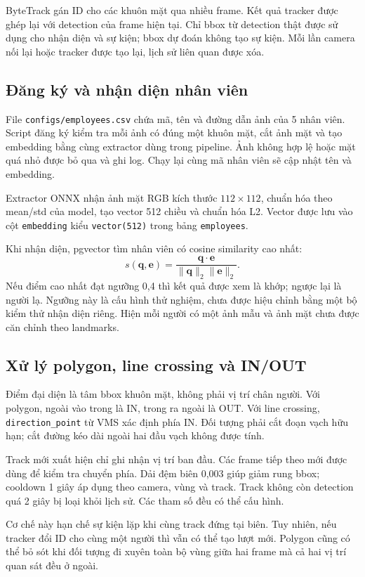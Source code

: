 \documentclass[11pt,a4paper]{article}
\begin{document}
ByteTrack gán ID cho các khuôn mặt qua nhiều frame. Kết quả tracker được ghép lại với detection của frame hiện tại. Chỉ bbox từ detection thật được sử dụng cho nhận diện và sự kiện; bbox dự đoán không tạo sự kiện. Mỗi lần camera nối lại hoặc tracker được tạo lại, lịch sử liên quan được xóa.

\subsection{Đăng ký và nhận diện nhân viên}
File \texttt{configs/employees.csv} chứa mã, tên và đường dẫn ảnh của 5 nhân viên. Script đăng ký kiểm tra mỗi ảnh có đúng một khuôn mặt, cắt ảnh mặt và tạo embedding bằng cùng extractor dùng trong pipeline. Ảnh không hợp lệ hoặc mặt quá nhỏ được bỏ qua và ghi log. Chạy lại cùng mã nhân viên sẽ cập nhật tên và embedding.

Extractor ONNX nhận ảnh mặt RGB kích thước $112\times112$, chuẩn hóa theo mean/std của model, tạo vector 512 chiều và chuẩn hóa L2. Vector được lưu vào cột \texttt{embedding} kiểu \texttt{vector(512)} trong bảng \texttt{employees}.

Khi nhận diện, pgvector tìm nhân viên có cosine similarity cao nhất:
\[
s(\mathbf{q},\mathbf{e})=
\frac{\mathbf{q}\cdot\mathbf{e}}{\|\mathbf{q}\|_2\|\mathbf{e}\|_2}.
\]
Nếu điểm cao nhất đạt ngưỡng 0,4 thì kết quả được xem là khớp; ngược lại là người lạ. Ngưỡng này là cấu hình thử nghiệm, chưa được hiệu chỉnh bằng một bộ kiểm thử nhận diện riêng. Hiện mỗi người có một ảnh mẫu và ảnh mặt chưa được căn chỉnh theo landmarks.

\subsection{Xử lý polygon, line crossing và IN/OUT}
Điểm đại diện là tâm bbox khuôn mặt, không phải vị trí chân người. Với polygon, ngoài vào trong là IN, trong ra ngoài là OUT. Với line crossing, \texttt{direction\_point} từ VMS xác định phía IN. Đối tượng phải cắt đoạn vạch hữu hạn; cắt đường kéo dài ngoài hai đầu vạch không được tính.

Track mới xuất hiện chỉ ghi nhận vị trí ban đầu. Các frame tiếp theo mới được dùng để kiểm tra chuyển phía. Dải đệm biên 0,003 giúp giảm rung bbox; cooldown 1 giây áp dụng theo camera, vùng và track. Track không còn detection quá 2 giây bị loại khỏi lịch sử. Các tham số đều có thể cấu hình.

Cơ chế này hạn chế sự kiện lặp khi cùng track đứng tại biên. Tuy nhiên, nếu tracker đổi ID cho cùng một người thì vẫn có thể tạo lượt mới. Polygon cũng có thể bỏ sót khi đối tượng đi xuyên toàn bộ vùng giữa hai frame mà cả hai vị trí quan sát đều ở ngoài.
\end{document}
